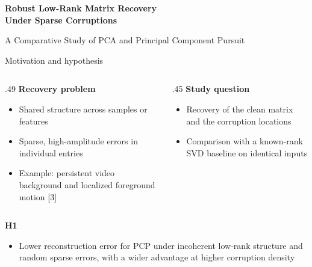 \documentclass[aspectratio=1610,11pt]{beamer}
\title{\shorttitle}
\subtitle{A Comparative Study of PCA and Principal Component Pursuit}
\author{Aashish M}
\newcommand{\heading}[1]{\textcolor{accent}{\textbf{#1}}\par\smallskip}
\newcommand{\bullets}{\begin{itemize}\setlength{\itemsep}{2.6mm}}
\newcommand{\closeitems}{\end{itemize}}
\begin{document}
\begin{frame}
  \par
  \vspace{4mm}
  {\fontsize{25}{29}\selectfont\bfseries
    Robust Low-Rank Matrix Recovery\\
    Under Sparse Corruptions\par}
  \vspace{3mm}
  {\large\textcolor{muted}{A Comparative Study of PCA and Principal Component Pursuit}}\par
  \vspace{7mm}
  {\normalsize\insertauthor\par}
\end{frame}

\begin{frame}[t]{Motivation and hypothesis}
  \begin{columns}[T,onlytextwidth]
    \begin{column}{.49\textwidth}
      \heading{Recovery problem}
      \bullets
        \item Shared structure across samples or features
        \item Sparse, high-amplitude errors in individual entries
        \item Example: persistent video background and localized foreground motion [3]
      \closeitems
    \end{column}
    \begin{column}{.45\textwidth}
      \heading{Study question}
      \bullets
        \item Recovery of the clean matrix and the corruption locations
        \item Comparison with a known-rank SVD baseline on identical inputs
      \closeitems
    \end{column}
  \end{columns}
  \vspace{4mm}
  \heading{H1}
  \bullets
    \item Lower reconstruction error for PCP under incoherent low-rank structure
      and random sparse errors, with a wider advantage at higher corruption density
  \closeitems
\end{frame}
\end{document}
